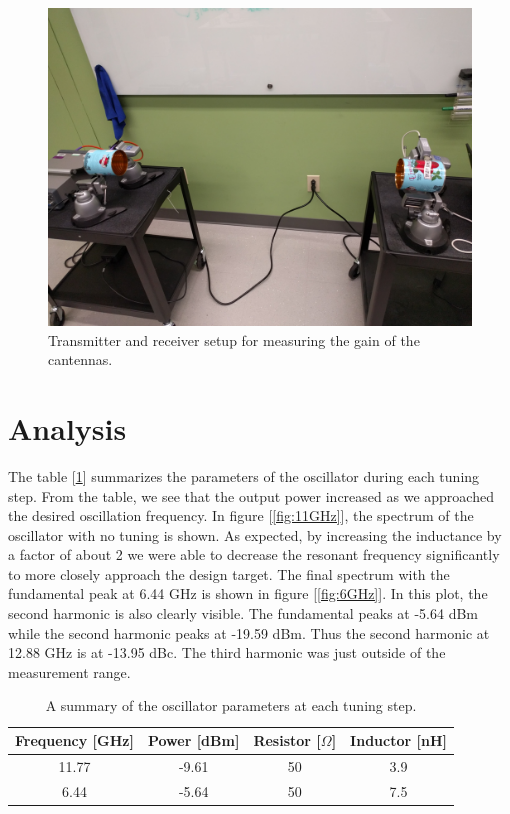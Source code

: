 \documentclass{article}
\begin{document}
\begin{figure}[!htbp]
    \centering
    \includegraphics[scale=0.04]{cantenna.jpg}
    \caption{Transmitter and receiver setup for measuring the gain of the cantennas.}
    \label{fig:cantennasetup}
\end{figure}

\section*{Analysis}\label{sec:analysis}

The table [\ref{tab:oscillator}] summarizes the parameters of the oscillator during each tuning step. From the table, we see that the output power increased as we approached the desired oscillation frequency. In figure [\ref{fig:11GHz}], the spectrum of the oscillator with no tuning is shown. As expected, by increasing the inductance by a factor of about 2 we were able to decrease the resonant frequency significantly to more closely approach the design target. The final spectrum with the fundamental peak at 6.44 GHz is shown in figure [\ref{fig:6GHz}]. In this plot, the second harmonic is also clearly visible. The fundamental peaks at -5.64  dBm while the second harmonic peaks at -19.59 dBm. Thus the second harmonic at 12.88 GHz is at -13.95 dBc. The third harmonic was just outside of the measurement range. 

\begin{table}[!htbp]
\begin{tabular}{| c | c | c | c |}
\hline
Frequency [GHz] & Power [dBm] & Resistor [$\Omega$] & Inductor [nH] \\
\hline
\hline
11.77 & -9.61 & 50 & 3.9 \\
\hline
6.44 & -5.64 & 50 & 7.5 \\
\hline
\end{tabular}
\caption{A summary of the oscillator parameters at each tuning step.}
\label{tab:oscillator}
\end{table}
\end{document}
